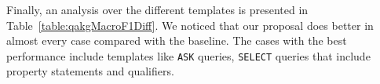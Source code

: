 Finally, an analysis over the different \LCQuADtwo{} templates is presented in Table~\ref{table:qakgMacroF1Diff}. 
We noticed that our proposal does better in almost every case compared with the baseline. The 
cases with the best performance include templates like \texttt{ASK} queries, \texttt{SELECT} 
queries that include property statements and qualifiers. 

\begin{table}[]
    \centering
\end{table}
